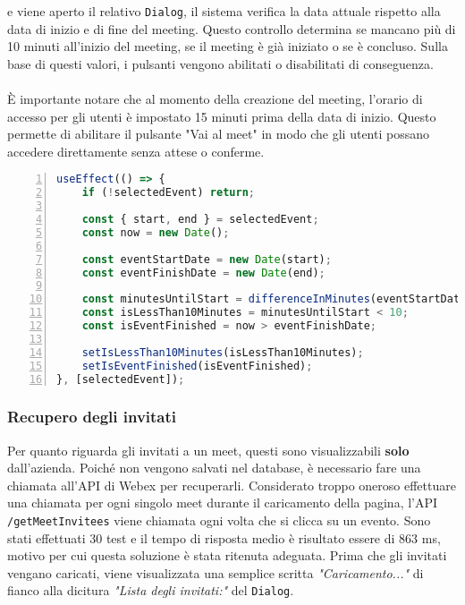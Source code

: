 e viene aperto il relativo \texttt{Dialog}, il sistema verifica la data attuale 
rispetto alla data di inizio e di fine del meeting. Questo controllo determina se mancano più di 10 
minuti all'inizio del meeting, se il meeting è già iniziato o se è concluso. Sulla base di questi valori, 
i pulsanti vengono abilitati o disabilitati di conseguenza.
\\ 
\\
È importante notare che al momento della creazione del meeting, 
l'orario di accesso per gli utenti è impostato 15 minuti prima della data di inizio. 
Questo permette di abilitare il pulsante "Vai al meet" in modo che gli utenti possano accedere 
direttamente senza attese o conferme.
\begin{lstlisting}[language=typescript, frame=lines, basicstyle=\ttfamily\scriptsize, numbers=left]
useEffect(() => {
    if (!selectedEvent) return;
      
    const { start, end } = selectedEvent;
    const now = new Date();
      
    const eventStartDate = new Date(start);
    const eventFinishDate = new Date(end);
      
    const minutesUntilStart = differenceInMinutes(eventStartDate, now);
    const isLessThan10Minutes = minutesUntilStart < 10;
    const isEventFinished = now > eventFinishDate;
      
    setIsLessThan10Minutes(isLessThan10Minutes);
    setIsEventFinished(isEventFinished);
}, [selectedEvent]);
\end{lstlisting}
\subsubsection{Recupero degli invitati}
Per quanto riguarda gli invitati a un meet, questi sono visualizzabili \textbf{solo} dall'azienda. 
Poiché non vengono salvati nel database, è necessario fare una chiamata all'API di Webex per recuperarli.
Considerato troppo oneroso effettuare una chiamata per ogni singolo meet durante il caricamento della 
pagina, l'API \texttt{/getMeetInvitees} viene chiamata ogni 
volta che si clicca su un evento. Sono stati effettuati 30 test e il tempo di risposta medio è 
risultato essere di 863 ms, motivo per cui questa soluzione è stata ritenuta adeguata. 
Prima che gli invitati vengano caricati, viene visualizzata 
una semplice scritta \textit{"Caricamento..."} di fianco alla dicitura \textit{"Lista degli invitati:"}
del \texttt{Dialog}.


